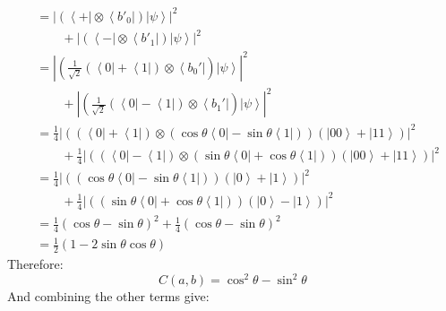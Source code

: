 \documentclass[12pt,a4]{article}
\begin{document}
\begin{enumerate}
\begin{enumerate}
\begin{align*}
                                 &= |(\left\langle + \right| \otimes \left\langle b'_0 \right|)\left|\psi\right\rangle|^2\\
                                 &\qquad + |(\left\langle - \right| \otimes \left\langle b'_1 \right|)\left|\psi\right\rangle|^2\\
                                 &= |(\frac{1}{\sqrt{2}}(\left\langle 0 \right| + \left\langle 1 \right|)\otimes \left\langle b_0' \right|)\left|\psi\right\rangle|^2\\
                                 &\qquad + |(\frac{1}{\sqrt{2}}(\left\langle 0 \right| - \left\langle 1 \right|)\otimes \left\langle b_1' \right|)\left|\psi\right\rangle|^2\\
                                 &= \frac{1}{4}|( (\left\langle 0 \right| + \left\langle 1 \right|)\otimes (\cos \theta \left\langle 0\right| - \sin \theta \left\langle1\right|))\left(\left| 00 \right \rangle + \left|11\right \rangle\right)|^2\\
                                 &\qquad + \frac{1}{4} |((\left\langle 0 \right| - \left\langle 1 \right|) \otimes (\sin\theta \left\langle 0\right| + \cos\theta \left\langle1\right|))\left(\left| 00 \right \rangle + \left|11\right \rangle\right)|^2\\
                                 &= \frac{1}{4}|( (\cos \theta \left\langle 0\right| - \sin \theta \left\langle1\right|))\left(\left| 0 \right \rangle + \left|1\right \rangle\right)|^2\\
                                 &\qquad + \frac{1}{4} |((\sin\theta \left\langle 0\right| + \cos\theta \left\langle1\right|))\left(\left| 0 \right \rangle - \left|1\right \rangle\right)|^2\\
                                 &= \frac{1}{4}(\cos \theta - \sin \theta )^2 + \frac{1}{4}(\cos \theta - \sin \theta)^2\\
                                 &= \frac{1}{2}(1 - 2 \sin \theta \cos\theta)
        \end{align*}
        Therefore:
        \begin{equation*}
          C(a, b) = \cos^2\theta - \sin^2\theta
        \end{equation*}
        And combining the other terms give:

\end{enumerate}
\end{enumerate}
\end{document}

